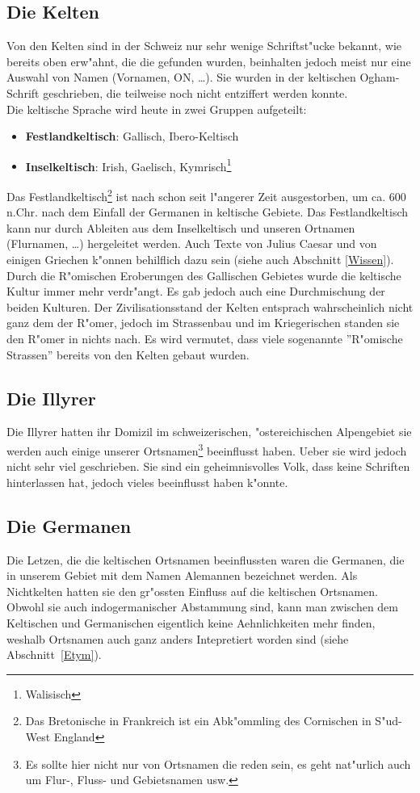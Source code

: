 \documentclass[10pt]{article}
\begin{document}
\subsection{Die Kelten}
Von den Kelten sind in der Schweiz nur sehr wenige Schriftst"ucke bekannt,
wie bereits oben erw"ahnt,
die die gefunden wurden, beinhalten jedoch meist nur eine Auswahl von
Namen (Vornamen, ON, \dots). Sie wurden in der keltischen Ogham-Schrift
geschrieben, die teilweise noch nicht entziffert werden konnte.\\
Die keltische Sprache wird heute in zwei Gruppen aufgeteilt:
\begin{itemize}
  \item {\bf Festlandkeltisch}: Gallisch, Ibero-Keltisch
  \item {\bf Inselkeltisch}: Irish, Gaelisch, Kymrisch\footnote{Walisisch}
\end{itemize}
Das Festlandkeltisch\footnote{Das Bretonische in Frankreich ist ein Abk"ommling des Cornischen in S"ud-West
England} ist nach schon seit l"angerer Zeit ausgestorben, um ca. 600 n.Chr.
nach dem Einfall der Germanen in keltische Gebiete. Das Festlandkeltisch kann nur durch Ableiten aus dem Inselkeltisch
und unseren Ortnamen (Flurnamen, \dots) hergeleitet werden. Auch Texte von
Julius Caesar und von einigen Griechen k"onnen behilflich dazu sein (siehe
auch Abschnitt \ref{Wissen}).\\
Durch die R"omischen Eroberungen des Gallischen Gebietes wurde die keltische
Kultur immer mehr verdr"angt. Es gab jedoch auch eine Durchmischung der 
beiden Kulturen. Der Zivilisationsstand der Kelten entsprach wahrscheinlich nicht
ganz dem der R"omer, jedoch im Strassenbau und im Kriegerischen
standen sie den R"omer in nichts nach. Es wird vermutet, dass viele
sogenannte ''R"omische Strassen'' bereits von den Kelten gebaut wurden. 

\subsection{Die Illyrer}
Die Illyrer hatten ihr Domizil im schweizerischen, "ostereichischen Alpengebiet
sie werden auch einige unserer Ortsnamen\footnote{Es sollte hier nicht nur
von Ortsnamen die reden sein, es geht nat"urlich auch um Flur-, Fluss- und
Gebietsnamen usw.} beeinflusst haben. Ueber sie wird jedoch nicht sehr viel
geschrieben. Sie sind ein geheimnisvolles Volk, dass keine Schriften hinterlassen
hat, jedoch vieles beeinflusst haben k"onnte.

\subsection{Die Germanen}
Die Letzen, die die keltischen Ortsnamen beeinflussten waren die Germanen,
die in unserem Gebiet mit dem Namen Alemannen bezeichnet werden.
Als Nichtkelten hatten sie den gr"ossten Einfluss auf die keltischen
Ortsnamen. Obwohl sie auch indogermanischer Abstammung sind, kann man zwischen
dem Keltischen und Germanischen eigentlich keine Aehnlichkeiten mehr finden, weshalb
Ortsnamen auch ganz anders Intepretiert worden sind (siehe Abschnitt~\ref{Etym}).
\end{document}
